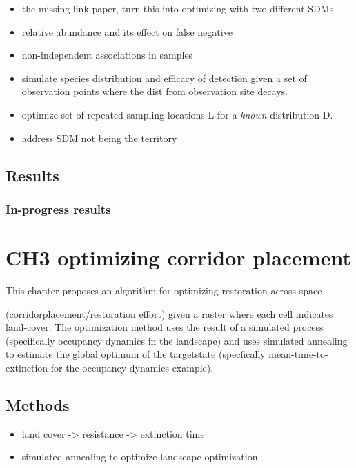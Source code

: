 \documentclass[10pt,oneside]{article}
\begin{document}
\begin{itemize}
\item
  the missing link paper, turn this into optimizing with two different
  SDMs
\item
  relative abundance and its effect on false negative
\item
  non-independent associations in samples
\item
  simulate species distribution and efficacy of detection given a set of
  observation points where the dist from observation site decays.
\item
  optimize set of repeated sampling locations L for a \emph{known}
  distribution D.
\item
  address SDM not being the territory
\end{itemize}

\hypertarget{results}{%
\subsection{Results}\label{results}}

\hypertarget{in-progress-results}{%
\subsubsection{In-progress results}\label{in-progress-results}}

\hypertarget{ch3-optimizing-corridor-placement}{%
\section{CH3 optimizing corridor
placement}\label{ch3-optimizing-corridor-placement}}

This chapter proposes an algorithm for optimizing restoration across
space

(corridorplacement/restoration effort) given a raster where each cell
indicates land-cover. The optimization method uses the result of a
simulated process (specifically occupancy dynamics in the landscape) and
uses simulated annealing to estimate the global optimum of the
targetstate (specfically mean-time-to-extinction for the occupancy
dynamics example).

\hypertarget{methods-2}{%
\subsection{Methods}\label{methods-2}}

\begin{itemize}
\tightlist
\item
  land cover -\textgreater{} resistance -\textgreater{} extinction time
\item
  simulated annealing to optimize landscape optimization
\end{itemize}
\end{document}
